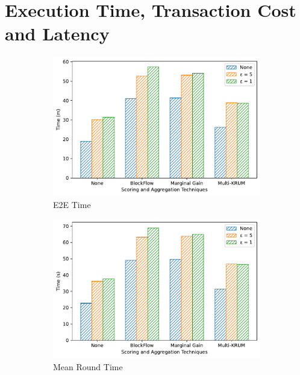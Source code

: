 
\section{Execution Time, Transaction Cost and Latency}

\begin{figure}[!ht]
    \centering
    \begin{subfigure}[b]{0.49\textwidth}
        \centering
        \includegraphics[width=\textwidth]{graphics/05_priv_e2e.pdf}
        \caption{E2E Time}
    \end{subfigure}
    \hfill
    \begin{subfigure}[b]{0.49\textwidth}
        \centering
        \includegraphics[width=\textwidth]{graphics/05_priv_round.pdf}
        \caption{Mean Round Time}
    \end{subfigure}
    \hfill
    \begin{subfigure}[b]{0.49\textwidth}

\end{subfigure}
\end{figure}
